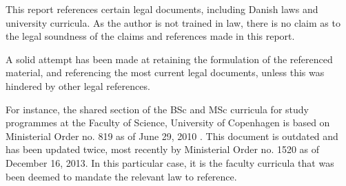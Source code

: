 This report references certain legal documents, including Danish laws and
university curricula. As the author is not trained in law, there is no claim as
to the legal soundness of the claims and references made in this report.

A solid attempt has been made at retaining the formulation of the referenced
material, and referencing the most current legal documents, unless this was
hindered by other legal references.

For instance, the shared section of the BSc and MSc curricula for study
programmes at the Faculty of Science, University of
Copenhagen\cite{faelles-del-ENG} is based on Ministerial Order no. 819 as of
June 29, 2010 \cite{bek814}. This document is outdated and has been updated
twice, most recently by Ministerial Order no.  1520 as of December 16,
2013\cite{bek1520}. In this particular case, it is the faculty curricula that
was been deemed to mandate the relevant law to reference.
